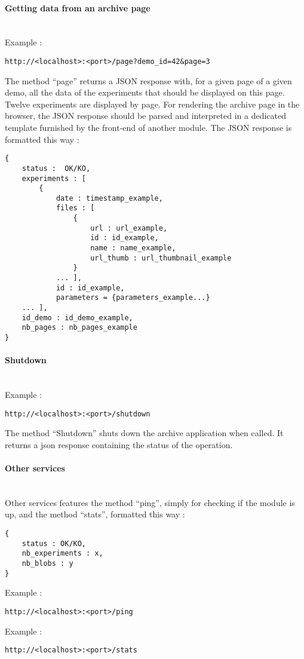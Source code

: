 \paragraph{Getting data  from an archive page} \hspace{0pt} \\
Example :
\begin{verbatim}
http://<localhost>:<port>/page?demo_id=42&page=3
\end{verbatim}
The method ``page'' returns a JSON response with, for a given page of a given demo, all the data of the experiments that should be displayed on this page. Twelve experiments are displayed by page. For rendering the archive page in the browser, the JSON response should be parsed and interpreted in a dedicated template furnished by the front-end of another module. The JSON response is formatted this way : 
\begin{verbatim}
{
    status :  OK/KO,
    experiments : [
        {
            date : timestamp_example, 
            files : [
                {
                    url : url_example,
                    id : id_example,
                    name : name_example,
                    url_thumb : url_thumbnail_example
                }
            ... ],
            id : id_example,
            parameters = {parameters_example...}
    ... ],
    id_demo : id_demo_example,
    nb_pages : nb_pages_example
}
\end{verbatim} 

\paragraph{Shutdown} \hspace{0pt} \\
Example :
\begin{verbatim}
http://<localhost>:<port>/shutdown
\end{verbatim}
The method ``Shutdown'' shuts down the archive application when called. It returns a json response containing the status of the operation.

\paragraph{Other services} \hspace{0pt} \\
Other services features the method ``ping'', simply for checking if the module is up, and the method ``stats'', formatted this way :
\begin{verbatim}
{
    status : OK/KO,
    nb_experiments : x,
    nb_blobs : y
}
\end{verbatim}
Example :
\begin{verbatim}
http://<localhost>:<port>/ping
\end{verbatim}
Example :
\begin{verbatim}
http://<localhost>:<port>/stats
\end{verbatim}

